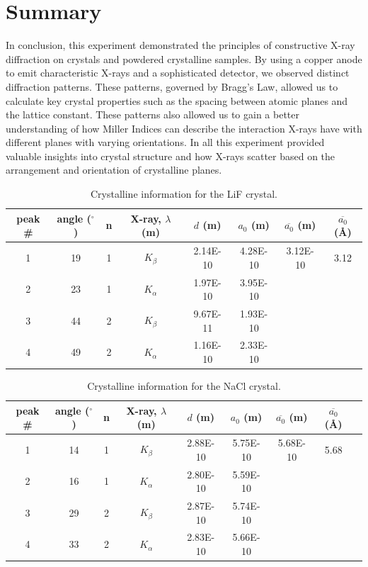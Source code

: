 \documentclass[a4paper,12pt,english]{all-in-one} %
\begin{document}
\section*{Summary}
{
In conclusion, this experiment demonstrated the principles of constructive X-ray diffraction on crystals and powdered crystalline samples. By using a copper anode to emit characteristic X-rays and a sophisticated detector, we observed distinct diffraction patterns. These patterns, governed by Bragg’s Law, allowed us to calculate key crystal properties such as the spacing between atomic planes and the lattice constant. These patterns also allowed us to gain a better understanding of how Miller Indices can describe the interaction X-rays have with different planes with varying orientations. In all this experiment provided valuable insights into crystal structure and how X-rays scatter based on the arrangement and orientation of crystalline planes.
}

\begin{table}[htb]
\centering
\begin{tabular}{c|c|c|c|c|c|c|c}
peak \# & angle ($^\circ$) & n & X-ray, $\lambda$ (m) & $d$ (m) & $a_0$ (m) & $\overline{a_0}$ (m) & $\overline{a_0}$ (\AA) \\ \hline
1 & 19 & 1 & $K_\beta$ & 2.14E-10 & 4.28E-10  & 3.12E-10 & 3.12\\
2 & 23 & 1 & $K_\alpha$ & 1.97E-10 & 3.95E-10 \\
3 & 44 & 2 & $K_\beta$ & 9.67E-11	& 1.93E-10\\
4 & 49 & 2 & $K_\alpha$ & 1.16E-10 & 2.33E-10 \\   
\end{tabular}
\caption{Crystalline information for the LiF crystal. }
\label{tab:lif}
\end{table}

\begin{table}[htb]
\centering
\begin{tabular}{c|c|c|c|c|c|c|c|c}
peak \# & angle ($^\circ$) & n & X-ray, $\lambda$ (m) & $d$ (m) & $a_0$ (m) & $\overline{a_0}$ (m) & $\overline{a_0}$ (\AA) \\ \hline
1 & 14 & 1 & $K_\beta$ & 2.88E-10 & 5.75E-10 & 5.68E-10 & 5.68 \\
2 & 16 & 1 & $K_\alpha$ & 2.80E-10 & 5.59E-10 \\
3 & 29 & 2 & $K_\beta$ & 2.87E-10 & 5.74E-10\\
4 & 33 & 2 & $K_\alpha$ & 2.83E-10 & 5.66E-10 \\  
\end{tabular}
\caption{Crystalline information for the NaCl crystal.}
\label{tab:nacl}
\end{table}
\end{document}
